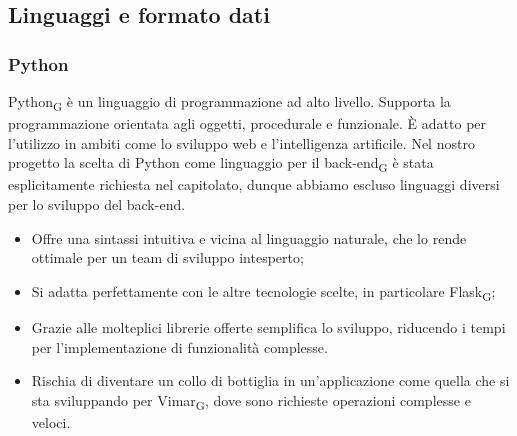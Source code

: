 \subsection{Linguaggi e formato dati}
\subsubsection{Python}
Python\textsubscript{G} è un linguaggio di programmazione ad alto livello. Supporta la programmazione orientata agli oggetti, procedurale e funzionale. È adatto per l'utilizzo in ambiti come lo sviluppo web e l'intelligenza artificile. Nel nostro progetto la scelta di Python come linguaggio per il back-end\textsubscript{G} è stata esplicitamente richiesta nel capitolato, dunque abbiamo escluso linguaggi diversi per lo sviluppo del back-end. 
\begin{itemize}
    \item Offre una sintassi intuitiva e vicina al linguaggio naturale, che lo rende ottimale per un team di sviluppo intesperto;
    \item Si adatta perfettamente con le altre tecnologie scelte, in particolare Flask\textsubscript{G};
    \item Grazie alle molteplici librerie offerte semplifica lo sviluppo, riducendo i tempi per l'implementazione di funzionalità complesse.
\end{itemize}
\begin{itemize}
    \item Rischia di diventare un collo di bottiglia in un'applicazione come quella che si sta sviluppando per Vimar\textsubscript{G}, dove sono richieste operazioni complesse e veloci.
\end{itemize}

